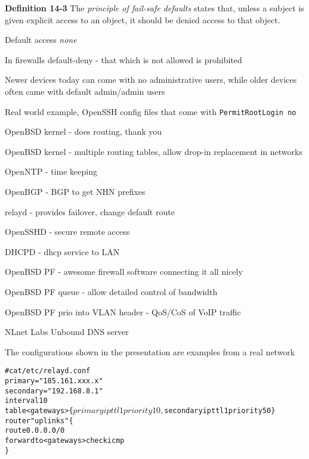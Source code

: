 \documentclass[Screen16to9,17pt]{foils}
\begin{document}

\begin{list1}
\item {\bf Definition 14-3} The \emph{principle of fail-safe defaults} states that, unless a subject is given explicit access to
 an object, it should be denied access to that object.
\item Default access \emph{none}
\item In firewalls default-deny - that which is not allowed is prohibited
\item Newer devices today can come with no administrative users, while older devices often came with default admin/admin users
\item Real world example, OpenSSH config files that come with \verb+PermitRootLogin no+
\end{list1}




\begin{list2}
\item OpenBSD kernel - does routing, thank you
\item OpenBSD kernel - multiple routing tables, allow drop-in replacement in networks
\item OpenNTP - time keeping
\item OpenBGP - BGP to get NHN prefixes
\item relayd - provides failover, change default route
\item OpenSSHD - secure remote access
\item DHCPD - dhcp service to LAN
\item OpenBSD PF - awesome firewall software connecting it all nicely
\item OpenBSD PF queue - allow detailed control of bandwidth
\item OpenBSD PF prio into VLAN header - QoS/CoS of VoIP traffic
\item NLnet Labs Unbound DNS server 
\end{list2}

The configurations shown in the presentation are examples from a real network


\begin{alltt}\footnotesize
# cat /etc/relayd.conf
primary = "185.161.xxx.x"
secondary = "192.168.8.1"
interval 10
table <gateways> \{ $primary ip ttl 1 priority 10, $secondary ip ttl 1 priority 50 \}
router "uplinks" \{
        route 0.0.0.0/0
        forward to <gateways> check icmp
\}
\end{alltt}
\end{document}
